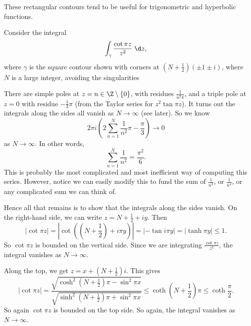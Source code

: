 \documentclass[a4paper]{article}
\begin{document}
These rectangular contours tend to be useful for trigonometric and hyperbolic functions.

\begin{eg}
  Consider the integral
  \[
    \int_\gamma \frac{\cot \pi z}{z^2}\;\d z,
  \]
  where $\gamma$ is the square contour shown with corners at $(N + \frac{1}{2})(\pm 1 \pm i)$, where $N$ is a large integer, avoiding the singularities
  \begin{center}
  \end{center}
  There are simple poles at $z = n\in \Z\setminus \{0\}$, with residues $\frac{1}{n^2 \pi}$, and a triple pole at $z = 0$ with residue $-\frac{1}{3}\pi$ (from the Taylor series for $z^2 \tan \pi z$). It turns out the integrals along the sides all vanish as $N \to \infty$ (see later). So we know
  \[
    2\pi i\left(2 \sum_{n = 1}^N \frac{1}{n^2} \pi - \frac{\pi}{3}\right) \to 0
  \]
  as $N \to \infty$. In other words,
  \[
    \sum_{n = 1}^N \frac{1}{n^2} = \frac{\pi^2}{6}.
  \]
  This is probably the most complicated and most inefficient way of computing this series. However, notice we can easily modify this to fund the sum of $\frac{1}{n^3}$, or $\frac{1}{n^4}$, or any complicated sum we can think of.

  Hence all that remains is to show that the integrals along the sides vanish. On the right-hand side, we can write $z = N + \frac{1}{2} + iy$. Then
  \[
    |\cot \pi z| = \left|\cot\left( \left(N + \frac{1}{2}\right) + i \pi y\right)\right| = |-\tan i \pi y| = |\tanh \pi y| \leq 1.
  \]
  So $\cot \pi z$ is bounded on the vertical side. Since we are integrating $\frac{\cot \pi z}{z^2}$, the integral vanishes as $N \to \infty$.

  Along the top, we get $z = x + \left(N + \frac{1}{2}\right)i$. This gives
  \[
    |\cot \pi z| = \frac{\sqrt{\cosh^2 \left(N + \frac{1}{2}\right) \pi - \sin^2 \pi x}}{\sqrt{\sinh^2 \left(N + \frac{1}{2}\right)\pi + \sin^2 \pi x}} \leq \coth\left(N + \frac{1}{2}\right) \pi \leq \coth \frac{\pi}{2}.
  \]
  So again $\cot \pi z$ is bounded on the top side. So again, the integral vanishes as $N \to \infty$.
\end{eg}
\end{document}
